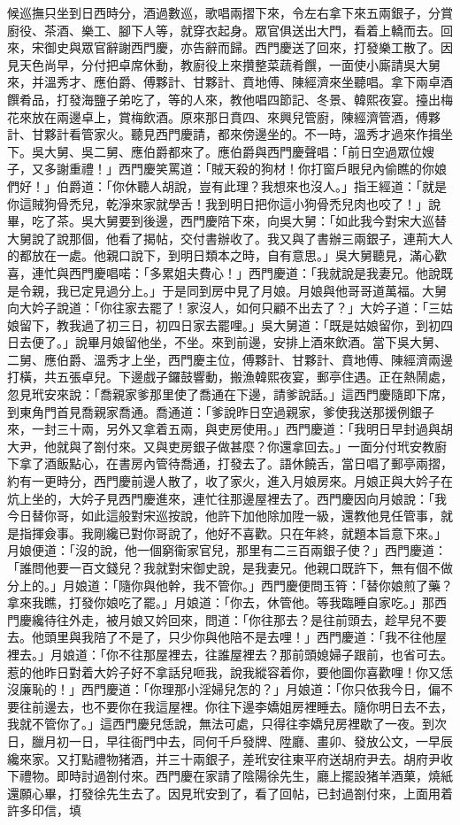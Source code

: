 候巡撫只坐到日西時分，酒過數巡，歌唱兩摺下來，令左右拿下來五兩銀子，分賞廚役、茶酒、樂工、腳下人等，就穿衣起身。眾官俱送出大門，看着上轎而去。回來，宋御史與眾官辭謝西門慶，亦告辭而歸。西門慶送了回來，打發樂工散了。因見天色尚早，分付把卓席休動，教廚役上來攢整菜蔬肴饌，一面使小廝請吳大舅來，并溫秀才、應伯爵、傅夥計、甘夥計、賁地傅、陳經濟來坐聽唱。拿下兩卓酒饌肴品，打發海鹽子弟吃了，等的人來，教他唱四節記、冬景、韓熙夜宴。擡出梅花來放在兩邊卓上，賞梅飲酒。原來那日賁四、來興兒管廚，陳經濟管酒，傅夥計、甘夥計看管家火。聽見西門慶請，都來傍邊坐的。不一時，溫秀才過來作揖坐下。吳大舅、吳二舅、應伯爵都來了。應伯爵與西門慶聲唱：「前日空過眾位嫂子，又多謝重禮！」西門慶笑罵道：「賊天殺的狗材！你打窗戶眼兒內偷瞧的你娘們好！」伯爵道：「你休聽人胡說，豈有此理？我想來也沒人。」指王經道：「就是你這賊狗骨禿兒，乾淨來家就學舌！我到明日把你這小狗骨禿兒肉也咬了！」說畢，吃了茶。吳大舅要到後邊，西門慶陪下來，向吳大舅：「如此我今對宋大巡替大舅說了說那個，他看了揭帖，交付書辦收了。我又與了書辦三兩銀子，連荊大人的都放在一處。他親口說下，到明日類本之時，自有意思。」吳大舅聽見，滿心歡喜，連忙與西門慶唱喏：「多累姐夫費心！」西門慶道：「我就說是我妻兄。他說既是令親，我已定見過分上。」于是同到房中見了月娘。月娘與他哥哥道萬福。大舅向大妗子說道：「你往家去罷了！家沒人，如何只顧不出去了？」大妗子道：「三姑娘留下，教我過了初三日，初四日家去罷哩。」吳大舅道：「既是姑娘留你，到初四日去便了。」說畢月娘留他坐，不坐。來到前邊，安排上酒來飲酒。當下吳大舅、二舅、應伯爵、溫秀才上坐，西門慶主位，傅夥計、甘夥計、賁地傅、陳經濟兩邊打橫，共五張卓兒。下邊戲子鑼鼓響動，搬漁韓熙夜宴，郵亭住遇。正在熱鬧處，忽見玳安來說：「喬親家爹那里使了喬通在下邊，請爹說話。」這西門慶隨即下席，到東角門首見喬親家喬通。喬通道：「爹說昨日空過親家，爹使我送那援例銀子來，一封三十兩，另外又拿着五兩，與吏房使用。」西門慶道：「我明日早封過與胡大尹，他就與了劄付來。又與吏房銀子做甚麼？你還拿回去。」一面分付玳安教廚下拿了酒飯點心，在書房內管待喬通，打發去了。語休饒舌，當日唱了郵亭兩摺，約有一更時分，西門慶前邊人散了，收了家火，進入月娘房來。月娘正與大妗子在炕上坐的，大妗子見西門慶進來，連忙往那邊屋裡去了。西門慶因向月娘說：「我今日替你哥，如此這般對宋巡按說，他許下加他除加陞一級，還教他見任管事，就是指揮僉事。我剛纔已對你哥說了，他好不喜歡。只在年終，就題本旨意下來。」月娘便道：「沒的說，他一個窮衞家官兒，那里有二三百兩銀子使？」西門慶道：「誰問他要一百文錢兒？我就對宋御史說，是我妻兄。他親口既許下，無有個不做分上的。」月娘道：「隨你與他幹，我不管你。」西門慶便問玉筲：「替你娘煎了藥？拿來我瞧，打發你娘吃了罷。」月娘道：「你去，休管他。等我臨睡自家吃。」那西門慶纔待往外走，被月娘又妗回來，問道：「你往那去？是往前頭去，趁早兒不要去。他頭里與我陪了不是了，只少你與他陪不是去哩！」西門慶道：「我不往他屋裡去。」月娘道：「你不往那屋裡去，往誰屋裡去？那前頭媳婦子跟前，也省可去。惹的他昨日對着大妗子好不拿話兒咂我，說我縱容着你，要他圖你喜歡哩！你又恁沒廉恥的！」西門慶道：「你理那小淫婦兒怎的？」月娘道：「你只依我今日，偏不要往前邊去，也不要你在我這屋裡。你往下邊李嬌姐房裡睡去。隨你明日去不去，我就不管你了。」這西門慶兒恁說，無法可處，只得往李嬌兒房裡歇了一夜。到次日，臘月初一日，早往衙門中去，同何千戶發牌、陞廳、畫卯、發放公文，一早辰纔來家。又打點禮物猪酒，并三十兩銀子，差玳安往東平府送胡府尹去。胡府尹收下禮物。即時討過劄付來。西門慶在家請了陰陽徐先生，廳上擺設猪羊酒菓，燒紙還願心畢，打發徐先生去了。因見玳安到了，看了回帖，已封過劄付來，上面用着許多印信，填